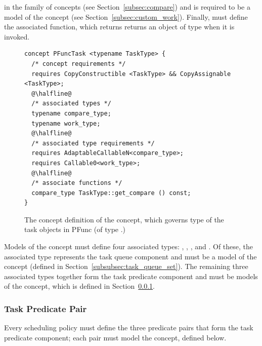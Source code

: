 in the  family of concepts (see
Section~\ref{subsec:compare}) and  is required to be a model
of the  concept (see Section~\ref{subsec:custom_work}).
%
Finally,  must define the 
associated function, which returns returns an object of type
 when it is invoked.
%
\begin{figure}
\begin{center}
\begin{minipage}{0.8\textwidth}
\begin{lstlisting}[frame=trbl]
concept PFuncTask <typename TaskType> {
  /* concept requirements */
  requires CopyConstructible <TaskType> && CopyAssignable <TaskType>;
  @\halfline@
  /* associated types */
  typename compare_type;
  typename work_type;
  @\halfline@
  /* associated type requirements */
  requires AdaptableCallableN<compare_type>;
  requires Callable0<work_type>;
  @\halfline@
  /* associate functions */
  compare_type TaskType::get_compare () const;
}
\end{lstlisting}
\end{minipage}
\end{center}
\caption{The concept definition of the  concept, which
governs type of the task objects in PFunc (of type .)}
\label{fig:pfunc_task_concept}
\end{figure}
%
Models of the  concept must define four
associated types: , ,
, and .
%
Of these, the  associated type represents the task queue
component and must be a model of the  concept (defined
in Section~\ref{subsubsec:task_queue_set}).
%
The remaining three associated types together form the task predicate component
and must be models of the  concept, which is
defined in Section~\ref{subsubsec:task_predicate}.

\subsubsection{Task Predicate Pair}
\label{subsubsec:task_predicate}
%
Every scheduling policy must define the three predicate pairs that form the
task predicate component; each pair must model the  concept, defined below.


